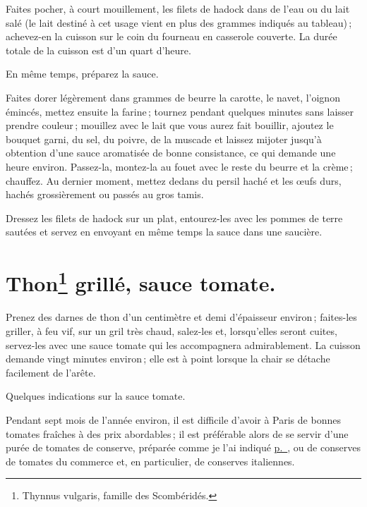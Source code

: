 Faites pocher, à court mouillement, les filets de hadock dans de l'eau ou du
lait salé (le lait destiné à cet usage vient en plus des {\mmm} grammes indiqués
au tableau) ; achevez-en la cuisson sur le coin du fourneau en casserole
couverte. La durée totale de la cuisson est d'un quart d'heure.

En même temps, préparez la sauce.

Faites dorer légèrement dans {\mmm} grammes de beurre la carotte, le navet,
l'oignon émincés, mettez ensuite la farine ; tournez pendant quelques minutes
sans laisser prendre couleur ; mouillez avec le lait que vous aurez fait
bouillir, ajoutez le bouquet garni, du sel, du poivre, de la muscade et laissez
mijoter jusqu'à obtention d'une sauce aromatisée de bonne consistance, ce qui
demande une heure environ. Passez-la, montez-la au fouet avec le reste du
beurre et la crème ; chauffez. Au dernier moment, mettez dedans du persil haché
et les œufs durs, hachés grossièrement ou passés au gros tamis.

Dressez les filets de hadock sur un plat, entourez-les avec les pommes de terre
sautées et servez en envoyant en même temps la sauce dans une saucière.

\section*{\centering Thon\footnote{Thynnus vulgaris, famille des Scombéridés.} grillé, sauce tomate.}

Prenez des darnes de thon d'un centimètre et demi d'épaisseur environ ;
faites-les griller, à feu vif, sur un gril très chaud, salez-les et,
lorsqu'elles seront cuites, servez-les avec une sauce tomate qui les
accompagnera admirablement. La cuisson demande vingt minutes environ ; elle est
à point lorsque la chair se détache facilement de l'arête.

\sk

\label{pg0401} \hypertarget{p0401}{}
Quelques indications sur la sauce tomate.

Pendant sept mois de l'année environ, il est difficile d'avoir à Paris de
bonnes tomates fraîches à des prix abordables ; il est préférable alors de se
servir d'une purée de tomates de conserve, préparée comme je l'ai indiqué
\hyperlink{p0768}{p. \pageref{pg0768}}, ou de conserves de tomates du commerce et,
en particulier, de conserves italiennes.


